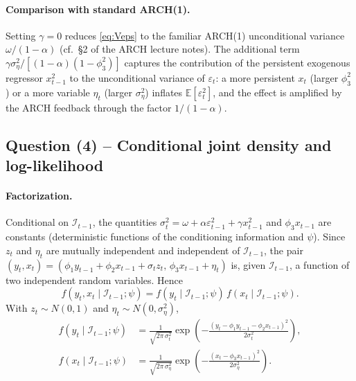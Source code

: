 \documentclass[12pt]{article}
\newcommand{\E}{\mathbb{E}}
\newcommand{\Info}{\mathcal{I}}
\begin{document}
\paragraph{Comparison with standard ARCH(1).} Setting $\gamma=0$ reduces \eqref{eq:Veps} to the familiar ARCH(1) unconditional variance $\omega/(1-\alpha)$ (cf.\ \S2 of the ARCH lecture notes). The additional term $\gamma\sigma_\eta^2/[(1-\alpha)(1-\phi_3^2)]$ captures the contribution of the persistent exogenous regressor $x_{t-1}^2$ to the unconditional variance of $\varepsilon_t$: a more persistent $x_t$ (larger $\phi_3^2$) or a more variable $\eta_t$ (larger $\sigma_\eta^2$) inflates $\E[\varepsilon_t^2]$, and the effect is amplified by the ARCH feedback through the factor $1/(1-\alpha)$.

\subsection*{Question (4) -- Conditional joint density and log-likelihood}\label{sec:p3-q4}

\paragraph{Factorization.} Conditional on $\Info_{t-1}$, the quantities $\sigma_t^2=\omega+\alpha\varepsilon_{t-1}^2+\gamma x_{t-1}^2$ and $\phi_3 x_{t-1}$ are constants (deterministic functions of the conditioning information and $\psi$). Since $z_t$ and $\eta_t$ are mutually independent and independent of $\Info_{t-1}$, the pair $(y_t,x_t)=(\phi_1 y_{t-1}+\phi_2 x_{t-1}+\sigma_t z_t,\,\phi_3 x_{t-1}+\eta_t)$ is, given $\Info_{t-1}$, a function of two independent random variables. Hence
\begin{equation}
f(y_t,x_t\mid\Info_{t-1};\psi) = f(y_t\mid\Info_{t-1};\psi)\,f(x_t\mid\Info_{t-1};\psi).\label{eq:factor}
\end{equation}
With $z_t\sim N(0,1)$ and $\eta_t\sim N(0,\sigma_\eta^2)$,
\begin{align}
f(y_t\mid\Info_{t-1};\psi)
&= \frac{1}{\sqrt{2\pi\,\sigma_t^2}}\exp\!\left(-\frac{(y_t-\phi_1 y_{t-1}-\phi_2 x_{t-1})^2}{2\sigma_t^2}\right),\label{eq:fy}\\
f(x_t\mid\Info_{t-1};\psi)
&= \frac{1}{\sqrt{2\pi\,\sigma_\eta^2}}\exp\!\left(-\frac{(x_t-\phi_3 x_{t-1})^2}{2\sigma_\eta^2}\right).\label{eq:fx}
\end{align}
\end{document}
